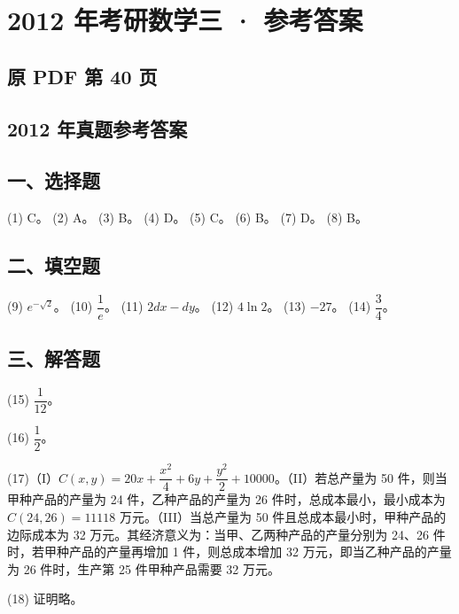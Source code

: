 \documentclass[UTF8,12pt]{ctexart}
\begin{document}
\section*{2012 年考研数学三 · 参考答案}
\subsection*{原 PDF 第 40 页}

\subsection*{2012 年真题参考答案}

\subsection*{一、选择题}

(1) C。 (2) A。 (3) B。 (4) D。 (5) C。 (6) B。 (7) D。 (8) B。


\subsection*{二、填空题}

(9) \(\displaystyle e^{-\sqrt2}\)。 (10) \(\displaystyle \dfrac{\displaystyle 1}{\displaystyle e}\)。 (11) \(\displaystyle 2dx-dy\)。 (12) \(\displaystyle 4\ln2\)。 (13) \(\displaystyle -27\)。 (14) \(\displaystyle \dfrac{\displaystyle 3}{\displaystyle 4}\)。


\subsection*{三、解答题}

(15) \(\displaystyle \dfrac{\displaystyle 1}{\displaystyle 12}\)。


(16) \(\displaystyle \dfrac{\displaystyle 1}{\displaystyle 2}\)。


(17)（I）\(\displaystyle C(x,\allowbreak y)=20x+\dfrac{\displaystyle x^2}{\displaystyle 4}+6y+\dfrac{\displaystyle y^2}{\displaystyle 2}+10000\)。（II）若总产量为 50 件，则当甲种产品的产量为 24 件，乙种产品的产量为 26 件时，总成本最小，最小成本为 \(\displaystyle C(24,\allowbreak 26)=11118\) 万元。（III）当总产量为 50 件且总成本最小时，甲种产品的边际成本为 32 万元。其经济意义为：当甲、乙两种产品的产量分别为 24、26 件时，若甲种产品的产量再增加 1 件，则总成本增加 32 万元，即当乙种产品的产量为 26 件时，生产第 25 件甲种产品需要 32 万元。


(18) 证明略。
\end{document}
